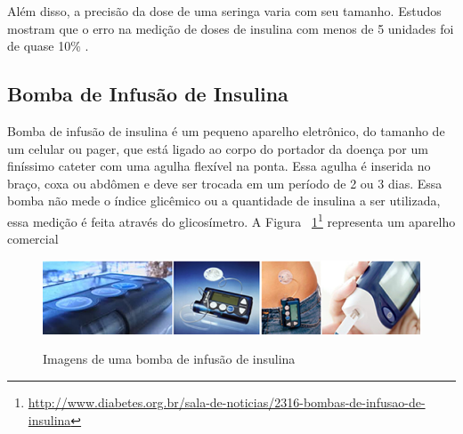Além disso, a precisão da dose de uma seringa varia com seu tamanho. Estudos mostram que o erro na medição de doses de insulina com menos de 5 unidades foi de quase 10\% \cite{magnolti2007update}.


\subsection{Bomba de Infusão de Insulina}

Bomba de infusão de insulina é um pequeno aparelho eletrônico, do tamanho de um celular ou pager, que está ligado ao corpo do portador da doença por um finíssimo cateter com uma agulha flexível na ponta. Essa agulha é inserida no braço, coxa ou abdômen e deve ser trocada em um período de 2 ou 3 dias. Essa bomba não mede o índice glicêmico ou a quantidade de insulina a ser utilizada, essa medição é feita através do glicosímetro. A Figura ~\ref{fig:bombainfusao}\footnote{\url{http://www.diabetes.org.br/sala-de-noticias/2316-bombas-de-infusao-de-insulina}} representa um aparelho comercial \cite{bode2002insulin}

\begin{figure}[htp]
	\centering
	\includegraphics[scale=1]{images/bombainsulina.png}
	\caption{Imagens de uma bomba de infusão de insulina}	
	\label{fig:bombainfusao}
	\cite{portaldiabetes2008}	
\end{figure}



